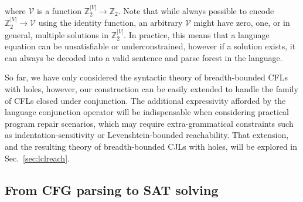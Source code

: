 \documentclass[sigplan,review,anonymous,acmsmall]{acmart}\settopmatter{printfolios=false,printccs=false,printacmref=false}
\begin{document}
\noindent where $\mathcal{V}$ is a function $\mathbb{Z}_2^{|V|}\rightarrow\mathbb{Z}_2$. Note that while always possible to encode $\mathbb{Z}_2^{|V|} \rightarrow \mathcal{V}$ using the identity function, an arbitrary $\mathcal{V}$ might have zero, one, or in general, multiple solutions in $\mathbb{Z}_2^{|V|}$. In practice, this means that a language equation can be unsatisfiable or underconstrained, however if a solution exists, it can always be decoded into a valid sentence and parse forest in the language.

So far, we have only considered the syntactic theory of breadth-bounded CFLs with holes, however, our construction can be easily extended to handle the family of CFLs closed under conjunction. The additional expressivity afforded by the language conjunction operator will be indispensable when considering practical program repair scenarios, which may require extra-grammatical constraints such as indentation-sensitivity or Levenshtein-bounded reachability. That extension, and the resulting theory of breadth-bounded CJLs with holes, will be explored in Sec.~\ref{sec:lclreach}.

\pagebreak\subsection{From CFG parsing to SAT solving}\label{sec:sat}

\begin{figure}[H]
\end{figure}
\end{document}
